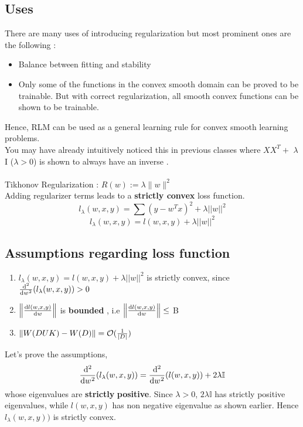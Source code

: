 \documentclass[12pt]{article}
\begin{document}
\subsection{Uses}
There are many uses of introducing regularization but most prominent ones are the following :
\begin{itemize}
\item Balance between fitting and stability
\item Only some of the functions in the convex smooth domain can be proved to be trainable. But with correct regularization, all smooth convex functions can be shown to be trainable.
\end{itemize}
Hence, RLM can be used as a general learning rule for convex smooth learning problems.\\
You may have already intuitively noticed this in previous classes where $XX^{T}+$ $\lambda$I ($\lambda>0$)  is shown to always have an inverse  .\\
\\
Tikhonov Regularization : \indent
$R(w) := \lambda \| w \|^{2} $
\\
Adding regularizer terms leads to a \textbf{strictly convex} loss function.
$$l_{\lambda}(w,x,y) = \sum{(y-{w^T}x)}^2 +\lambda||w||^2 $$
$$l_{\lambda}(w,x,y) = l(w,x,y) +\lambda||w||^2 $$

\subsection{Assumptions regarding loss function}
\begin{enumerate}
    \item $l_{\lambda}(w,x,y) = l(w,x,y) +\lambda||w||^2 $ is strictly convex, since $\diff*[2]{(l_{\lambda}(w,x,y))}{w} > 0$
    \item  $\normx{\diff{l(w,x,y)}{w}}$ is \textbf{bounded} , i.e $\normx{\diff{l(w,x,y)}{w}} \leq $ B
    \item $\left\Vert W(D U K) - W(D)\right\Vert = \mathcal{O}(\frac{1}{|D|})$
\end{enumerate}
\noindent
Let's prove the assumptions,
$$\diff*[2]{(l_{\lambda}(w,x,y))}{w}= \diff*[2]{(l(w,x,y))}{w} + 2\lambda \mathbb{I}$$ 
whose eigenvalues are \textbf{strictly} \textbf{positive}. Since $\lambda>0$, $2\lambda\mathbb{I}$ has strictly positive eigenvalues, while  $l(w,x,y)$ has non negative eigenvalue as shown earlier. Hence $l_{\lambda}(w,x,y))$ is strictly convex.\\

\end{document}

